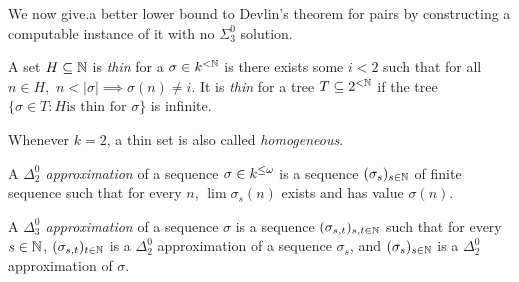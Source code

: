 %




We now give.a better lower bound to Devlin's theorem for pairs by constructing a computable instance of it with no $\Sigma^0_3$ solution.

\begin{definition}
  A set $H\subseteq\mathbb{N}$ is \emph{thin} for a $\sigma\in k^{<\mathbb{N}}$ is there exists
  some $i<2$ such that for all $n\in H,$ $n<|\sigma|\implies \sigma(n)\neq i$. It is
 \emph{thin} for a tree $T\subseteq2^{<\mathbb{N}}$ if the tree $\{\sigma\in T:H\text{
  is thin for }\sigma\}$ is infinite.
\end{definition}

Whenever $k = 2$, a thin set is also called \emph{homogeneous}.

\begin{definition}
  A \emph{$\Delta^0_2$ approximation} of a sequence $\sigma\in k^{\leq\omega}$ is a sequence $(\sigma_s)_{s\in\mathbb{N}}$ of finite sequence such
  that for every $n$, $\lim \sigma_s(n)$ exists and has value $\sigma(n)$.

  A \emph{$\Delta^0_3$ approximation} of a sequence $\sigma$ is a sequence $(\sigma_{s,t})_{s,t\in\mathbb{N}}$
  such that for every $s\in \mathbb{N}$, $(\sigma_{s,t})_{t\in\mathbb{N}}$ is a $\Delta^0_2$
  approximation of a sequence $\sigma_s$, and $(\sigma_s)_{s\in\mathbb{N}}$ is a $\Delta^0_2$
  approximation of $\sigma$.
\end{definition}

